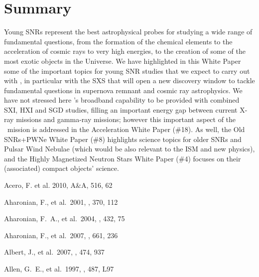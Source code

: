 \documentclass[11pt,a4paper]{article}
\begin{document}
{\section{Summary}

Young SNRs represent the best astrophysical probes for studying a wide range of fundamental questions, from the formation of the chemical elements
to the acceleration of cosmic rays to very high energies, to the creation of some of the most exotic objects in the Universe.
We have highlighted in this White Paper some of the important topics for young SNR studies that we expect to carry out with \ah, in particular
with the SXS that will open a new discovery window to tackle fundamental questions in supernova remnant and cosmic ray astrophysics.
We have not stressed here \ah's broadband capability to be provided with combined SXI, HXI and SGD studies, filling an important energy gap between current X-ray
missions and gamma-ray missions; however this important aspect of the \ah\ mission is addressed in the Acceleration White Paper (\#18). 
As well, the Old SNRs+PWNe White Paper (\#8) highlights science topics for older SNRs and Pulsar Wind Nebulae (which would be also
relevant to the ISM and new physics), 
and the Highly Magnetized Neutron Stars White Paper (\#4) focuses on their (associated) compact objects' science.


\clearpage
\begin{multicols}{2}
{\footnotesize

\begin{thebibliography}{99}

Acero, F. et al. 2010, A\&A, 516, 62


 Aharonian, F., et
  al.\ 2001, \aap, 370, 112

 Aharonian, F.~A., et
  al.\ 2004, \nat, 432, 75

 Aharonian, F., et
  al.\ 2007, \apj, 661, 236

 Albert, J., et al.\ 2007,
  \aap, 474, 937

 Allen, G.~E., et al.\ 1997,
  \apj, 487, L97
  

\end{thebibliography}}
\end{multicols}}
\end{document}
